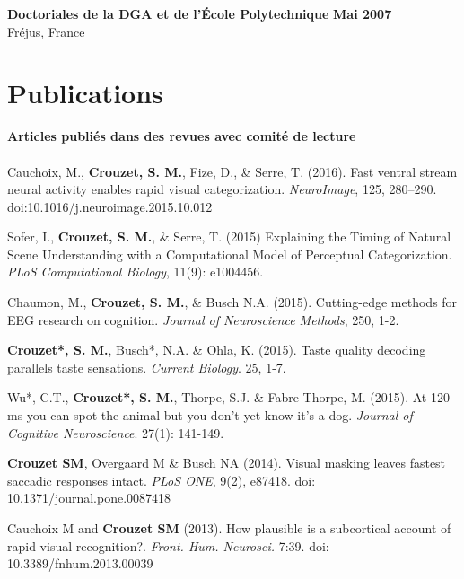 \documentclass[margin,line]{resume}
\begin{document}
\begin{resume}
	\textbf{Doctoriales de la DGA et de l'École Polytechnique} \hfill \textbf{Mai 2007}\\
	Fréjus, France
	\vspace{-1.5mm}


\vspace{3mm}	
\section{\mysidestyle Publications}

\textbf{Articles publiés dans des revues avec comité de lecture}\\\\
    Cauchoix, M., \textbf{Crouzet, S. M.}, Fize, D., \& Serre, T. (2016). Fast ventral stream neural activity enables rapid visual categorization. \textit{NeuroImage}, 125, 280–290. doi:10.1016/j.neuroimage.2015.10.012

	\vspace{-2mm} Sofer, I., \textbf{Crouzet, S. M.}, \& Serre, T. (2015) Explaining the Timing of Natural Scene Understanding with a Computational Model of Perceptual Categorization. \textit{PLoS Computational Biology}, 11(9): e1004456.

	\vspace{-2mm} Chaumon, M., \textbf{Crouzet, S. M.}, \& Busch N.A. (2015). Cutting-edge methods for EEG research on cognition. \textit{Journal of Neuroscience Methods}, 250, 1-2.

\newpage

	\vspace{-2mm} \textbf{Crouzet*, S. M.}, Busch*, N.A. \& Ohla, K. (2015). Taste quality decoding parallels taste sensations. \textit{Current Biology}. 25, 1-7.

	\vspace{-2mm} Wu*, C.T.,  \textbf{Crouzet*, S. M.}, Thorpe, S.J. \& Fabre-Thorpe, M. (2015). At 120 ms you can spot the animal but you don't yet know it's a dog. \textit{Journal of Cognitive Neuroscience}. 27(1): 141-149.

  	\vspace{-2mm} \textbf{Crouzet SM}, Overgaard M \& Busch NA (2014). Visual masking leaves fastest saccadic responses intact. \textit{PLoS ONE}, 9(2), e87418. doi: 10.1371/journal.pone.0087418

	\vspace{-2mm} Cauchoix M and \textbf{Crouzet SM} (2013). How plausible is a subcortical account of rapid visual recognition?. \textit{Front. Hum. Neurosci.} 7:39. doi: 10.3389/fnhum.2013.00039
	

\end{resume}
\end{document}
